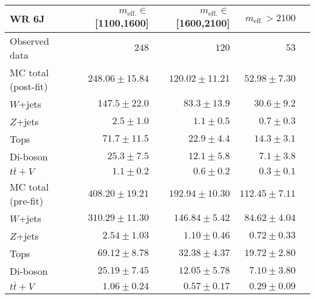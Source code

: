 \begin{table}
  \begin{center}
    \caption{ \label{tab::BGestimation::VRyields_6J}   }

    \begin{tabular*}{\textwidth}{@{\extracolsep{\fill}}lrrrr}
      \toprule
      \textbf{WR 6J} &  $m_{\mathrm{eff.}}\in$[1100,1600] & $m_{\mathrm{eff.}}\in$[1600,2100] & $m_{\mathrm{eff.}}>2100$ \\
      \midrule

Observed data          & $248$              & $120$              & $53$                    \\
\midrule
\midrule
MC total (post-fit)         & $248.06 \pm 15.84$          & $120.02 \pm 11.21$          & $52.98 \pm 7.30$              \\
\midrule
        $W$+jets         & $147.5 \pm 22.0$          & $83.3 \pm 13.9$          & $30.6 \pm 9.2$              \\
        $Z$+jets         & $2.5 \pm 1.0$          & $1.1 \pm 0.5$          & $0.7 \pm 0.3$              \\
        Tops         & $71.7 \pm 11.5$          & $22.9 \pm 4.4$          & $14.3 \pm 3.1$              \\
        Di-boson         & $25.3 \pm 7.5$          & $12.1 \pm 5.8$          & $7.1 \pm 3.8$              \\
        $t\bar{t}+V$         & $1.1 \pm 0.2$          & $0.6 \pm 0.2$          & $0.3 \pm 0.1$              \\
\midrule
\midrule
MC total (pre-fit)              & $408.20 \pm 19.21$          & $192.94 \pm 10.30$          & $112.45 \pm 7.11$              \\
\midrule
        $W$+jets         & $310.29 \pm 11.30$          & $146.84 \pm 5.42$          & $84.62 \pm 4.04$              \\
        $Z$+jets         & $2.54 \pm 1.03$          & $1.10 \pm 0.46$          & $0.72 \pm 0.33$              \\
        Tops         & $69.12 \pm 8.78$          & $32.38 \pm 4.37$          & $19.72 \pm 2.80$              \\
        Di-boson         & $25.19 \pm 7.45$          & $12.05 \pm 5.78$          & $7.10 \pm 3.80$              \\
        $t\bar{t}+V$         & $1.06 \pm 0.24$          & $0.57 \pm 0.17$          & $0.29 \pm 0.09$              \\
    \bottomrule
    \end{tabular*}



\end{center}
\end{table}
